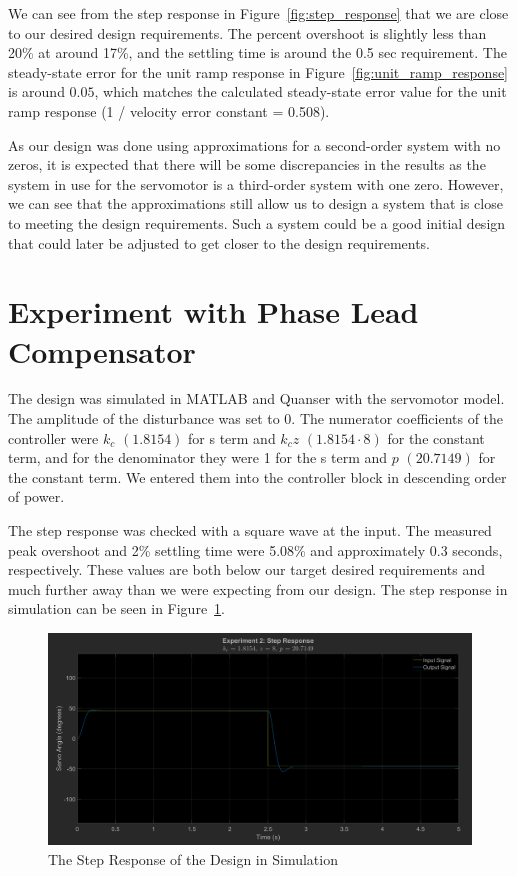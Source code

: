 \documentclass[12pt]{article}
\begin{document}
We can see from the step response in Figure~\ref{fig:step_response} that we are close to our desired design requirements. The percent overshoot is slightly less than 20\% at around 17\%, and the settling time is around the 0.5 sec requirement. The steady-state error for the unit ramp response in Figure~\ref{fig:unit_ramp_response} is around $0.05$, which matches the calculated steady-state error value for the unit ramp response (1 / velocity error constant = 0.508). 

As our design was done using approximations for a second-order system with no zeros, it is expected that there will be some discrepancies in the results as the system in use for the servomotor is a third-order system with one zero. However, we can see that the approximations still allow us to design a system that is close to meeting the design requirements. Such a system could be a good initial design that could later be adjusted to get closer to the design requirements.

\section{Experiment with Phase Lead Compensator}
The design was simulated in MATLAB and Quanser with the servomotor model. The amplitude of the disturbance was set to 0. The numerator coefficients of the controller were $k_c$ $(1.8154)$ for s term and $k_cz$ $(1.8154 \cdot 8)$ for the constant term, and for the denominator they were 1 for the s term and $p$ $(20.7149)$ for the constant term. We entered them into the controller block in descending order of power.

The step response was checked with a square wave at the input. The measured peak overshoot and 2\% settling time were 5.08\% and approximately 0.3 seconds, respectively. These values are both below our target desired requirements and much further away than we were expecting from our design. The step response in simulation can be seen in Figure~\ref{fig:exp2_step}.

\begin{figure}[h!]
	\centering
	\includegraphics[width=\textwidth]{exp2_step_response}
	\caption{\label{fig:exp2_step}The Step Response of the Design in Simulation}
\end{figure}
\end{document}
